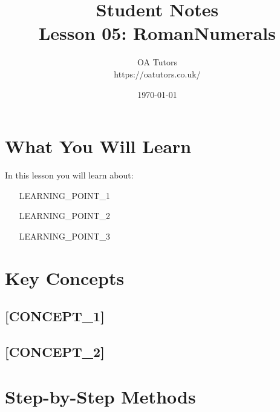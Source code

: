 \documentclass[a4paper,12pt]{article}
\begin{document}
\title{\textcolor{oablue}{\Huge Student Notes} \\ 
       \textcolor{oablue}{\Large Lesson 05: RomanNumerals}}
\author{\textcolor{oablue}{OA Tutors} \\ 
        \textcolor{oagray}{https://oatutors.co.uk/}}
\date{\textcolor{oagray}{\today}}

\maketitle

\section{What You Will Learn}
In this lesson you will learn about:
\begin{itemize}
    \item [LEARNING_POINT_1]
    \item [LEARNING_POINT_2]
    \item [LEARNING_POINT_3]
\end{itemize}

\section{Key Concepts}

\subsection{[CONCEPT_1]}
\begin{keypoint}
\end{keypoint}

\begin{example}
[EXAMPLE_1]
\end{example}

\subsection{[CONCEPT_2]}
\begin{keypoint}
\end{keypoint}

\begin{example}
[EXAMPLE_2]
\end{example}

\section{Step-by-Step Methods}
\end{document}
